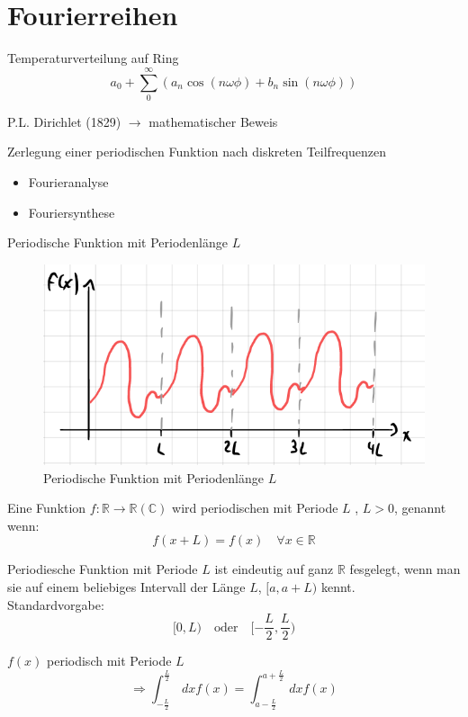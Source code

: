 \section{Fourierreihen}
	Temperaturverteilung auf Ring
	$$a_0 + \sum_0^\infty (a_n \cos(n\omega\phi) + b_n \sin(n\omega\phi))$$

	P.L. Dirichlet (1829) $\rightarrow$ mathematischer Beweis

	Zerlegung einer periodischen Funktion nach diskreten Teilfrequenzen
	\begin{itemize}
		\item Fourieranalyse
		\item Fouriersynthese
	\end{itemize}

	Periodische Funktion mit Periodenlänge $L$
	\begin{figure}[H]
		\centering
		\includegraphics[width=0.7\linewidth]{Grafiken/2_Fourierreihen/Grafik1.PNG}
		\caption{Periodische Funktion mit Periodenlänge $L$}
		\label{}
	\end{figure}

	\begin{Def}
		Eine Funktion $f: \mathbb{R}\rightarrow\mathbb{R}(\mathbb{C})$ wird periodischen
		mit Periode $L$ , $L>0$, genannt wenn:
		$$f(x+L) = f(x) \quad \forall x \in \mathbb{R}$$
	\end{Def}

	\begin{Bem}
		Periodiesche Funktion mit Periode $L$ ist eindeutig auf ganz $\mathbb{R}$ fesgelegt,
		wenn man sie auf einem beliebiges Intervall der Länge $L$, $[a,a+L)$ kennt.\\
		Standardvorgabe:
		$$[0,L) \quad \textrm{oder} \quad [-\frac{L}{2}, \frac{L}{2})$$
	\end{Bem}

	\begin{Bem}
		$f(x)$ periodisch mit Periode $L$
		$$\Rightarrow \int_{-\frac{L}{2}}^{\frac{L}{2}} \,dx f(x) = \int_{a-\frac{L}{2}}^{a+\frac{L}{2}} \,dx f(x)$$
	\end{Bem}


